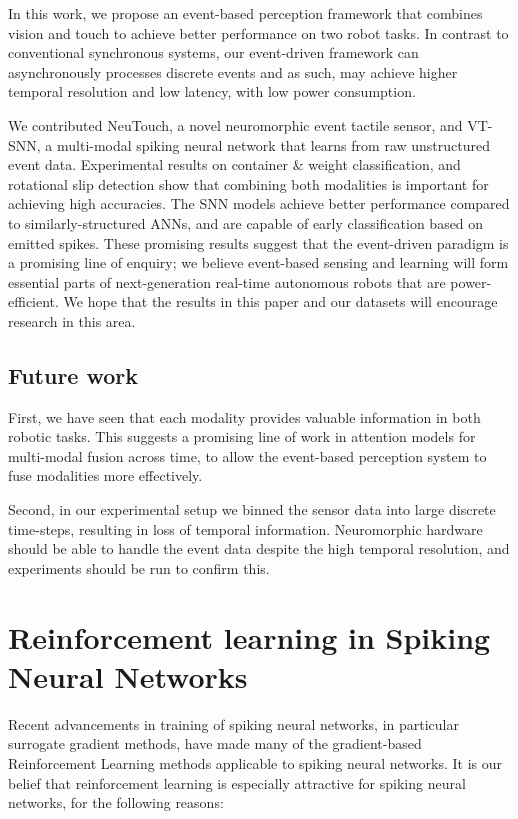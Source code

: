 \documentclass[fyp]{socreport}
\begin{document}
In this work, we propose an event-based perception framework that combines
vision and touch to achieve better performance on two robot tasks. In contrast
to conventional synchronous systems, our event-driven framework can
asynchronously processes discrete events and as such, may achieve higher
temporal resolution and low latency, with low power consumption.

We contributed NeuTouch, a novel neuromorphic event tactile sensor, and VT-SNN,
a multi-modal spiking neural network that learns from raw unstructured event
data. Experimental results on container \& weight classification, and rotational
slip detection show that combining both modalities is important for achieving
high accuracies. The SNN models achieve better performance compared to
similarly-structured ANNs, and are capable of early classification based on
emitted spikes. These promising results suggest that the event-driven paradigm
is a promising line of enquiry; we believe event-based sensing and learning will
form essential parts of next-generation real-time autonomous robots that are
power-efficient. We hope that the results in this paper and our datasets will
encourage research in this area.

\section{Future work\label{sec:future_work}}

First, we have seen that each modality provides valuable information in both
robotic tasks. This suggests a promising line of work in attention models for
multi-modal fusion across time, to allow the event-based perception system to
fuse modalities more effectively.

Second, in our experimental setup we binned the sensor data into large discrete
time-steps, resulting in loss of temporal information. Neuromorphic hardware
should be able to handle the event data despite the high temporal resolution,
and experiments should be run to confirm this.

\printbibliography
\appendix

\chapter{Reinforcement learning in Spiking Neural Networks\label{cha:snnrl}}

Recent advancements in training of spiking neural networks, in particular
surrogate gradient methods, have made many of the gradient-based Reinforcement
Learning methods applicable to spiking neural networks. It is our belief that
reinforcement learning is especially attractive for spiking neural networks, for
the following reasons:
\end{document}
